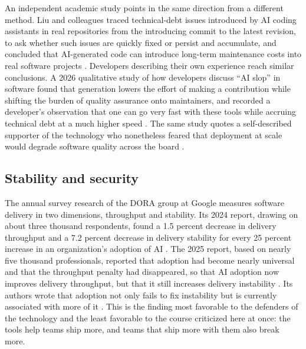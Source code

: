 \documentclass[11pt,a4paper]{article}
\theoremstyle{remark}
\begin{document}
An independent academic study points in the same direction from a different method. Liu and colleagues traced technical-debt issues introduced by AI coding assistants in real repositories from the introducing commit to the latest revision, to ask whether such issues are quickly fixed or persist and accumulate, and concluded that AI-generated code can introduce long-term maintenance costs into real software projects \cite{Liu2026}. Developers describing their own experience reach similar conclusions. A 2026 qualitative study of how developers discuss ``AI slop'' in software found that generation lowers the effort of making a contribution while shifting the burden of quality assurance onto maintainers, and recorded a developer's observation that one can go very fast with these tools while accruing technical debt at a much higher speed \cite{Slop2026Dev}. The same study quotes a self-described supporter of the technology who nonetheless feared that deployment at scale would degrade software quality across the board \cite{Slop2026Dev}.

\subsection{Stability and security}

The annual survey research of the DORA group at Google measures software delivery in two dimensions, throughput and stability. Its 2024 report, drawing on about three thousand respondents, found a 1.5 percent decrease in delivery throughput and a 7.2 percent decrease in delivery stability for every 25 percent increase in an organization's adoption of AI \cite{TechTarget2025}. The 2025 report, based on nearly five thousand professionals, reported that adoption had become nearly universal and that the throughput penalty had disappeared, so that AI adoption now improves delivery throughput, but that it still increases delivery instability \cite{DORA2025,InfoQ2025}. Its authors wrote that adoption not only fails to fix instability but is currently associated with more of it \cite{RedMonk2025}. This is the finding most favorable to the defenders of the technology and the least favorable to the course criticized here at once: the tools help teams ship more, and teams that ship more with them also break more.
\end{document}
